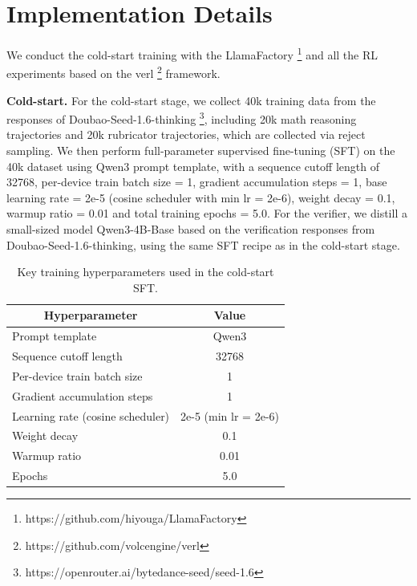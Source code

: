 \section{Implementation Details} \label{apdx:impl-details}
We conduct the cold-start training with the LlamaFactory \footnote{https://github.com/hiyouga/LlamaFactory} and all the RL experiments based on the verl \footnote{https://github.com/volcengine/verl} framework. 

\textbf{Cold-start. }
For the cold-start stage, we collect 40k training data from the responses of Doubao-Seed-1.6-thinking \footnote{https://openrouter.ai/bytedance-seed/seed-1.6}, including 20k math reasoning trajectories and 20k rubricator trajectories, which are collected via reject sampling. 
We then perform full-parameter supervised fine-tuning (SFT) on the 40k dataset using Qwen3 prompt template, with a sequence cutoff length of 32768, per-device train batch size = 1, gradient accumulation steps = 1, base learning rate = 2e-5 (cosine scheduler with min lr = 2e-6), weight decay = 0.1, warmup ratio = 0.01 and total training epochs = 5.0. 
For the verifier, we distill a small-sized model Qwen3-4B-Base based on the verification responses from Doubao-Seed-1.6-thinking, using the same SFT recipe as in the cold-start stage.


\begin{table}[h]
\centering
\begin{tabularx}{0.55\linewidth}{l|c}
  \toprule
\multicolumn{1}{c}{\textbf{Hyperparameter}} \vline & \multicolumn{1}{c}{\textbf{Value}} \\
\midrule
\small
Prompt template                       & Qwen3 \\
Sequence cutoff length                & 32768 \\
Per-device train batch size           & 1 \\
Gradient accumulation steps           & 1 \\
Learning rate (cosine scheduler)      & 2e-5 (min lr = 2e-6) \\
Weight decay                          & 0.1 \\
Warmup ratio                          & 0.01 \\
Epochs                                & 5.0 \\
\bottomrule
\end{tabularx}
\caption{Key training hyperparameters used in the cold-start SFT.}
\label{tab:sft_hyper}
\end{table}

